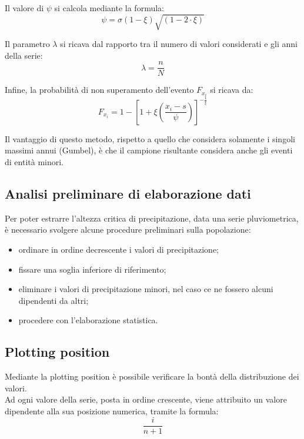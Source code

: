 \noindent Il valore di $\psi$ si calcola mediante la formula:
\begin{equation}
    \psi = \sigma(1-\xi) \sqrt{(1-2 \cdot \xi)}
\end{equation}

\noindent Il parametro $\lambda$ si ricava dal rapporto tra il numero di valori considerati e gli anni della serie:
\begin{equation}
    \lambda = \frac{n}{N}
\end{equation}

\noindent Infine, la probabilità di non superamento dell'evento $F_{x_i}$ si ricava da:
\begin{equation}
F_{x_i} = 1- \left[ 1+\xi\left(\frac{x_i - s}{\psi}\right)\right]^{-\frac{1}{\xi}}
\end{equation}

\noindent Il vantaggio di questo metodo, rispetto a quello che considera solamente i singoli massimi annui (Gumbel), è che il campione risultante considera anche gli eventi di entità minori.

\subsection{Analisi preliminare di elaborazione dati}
Per poter estrarre l'altezza critica di precipitazione, data una serie pluviometrica, è necessario svolgere alcune procedure preliminari sulla popolazione:
\begin{itemize}
    \item ordinare in ordine decrescente i valori di precipitazione;
    \item fissare una soglia inferiore di riferimento;
    \item eliminare i valori di precipitazione minori, nel caso ce ne fossero alcuni dipendenti da altri;
    \item procedere con l'elaborazione statistica.
\end{itemize}

\subsection{Plotting position}
Mediante la plotting position è possibile verificare la bontà della distribuzione dei valori.\\
Ad ogni valore della serie, posta in ordine crescente, viene attribuito un valore dipendente alla sua posizione numerica, tramite la formula:
\begin{equation}
    \frac{i}{n+1}
\end{equation}

